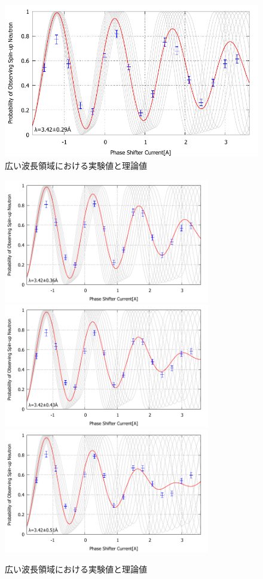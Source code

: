 \begin{figure}[H]
\includegraphics[width=9.cm]{discussion/SEA/IT_480_40.pdf}
\caption{広い波長領域における実験値と理論値}
\end{figure}
\begin{figure}[H]
\ContinuedFloat
\centering
\includegraphics[width=9cm]{discussion/SEA/IT_480_50.pdf}
\includegraphics[width=9cm]{discussion/SEA/IT_480_60.pdf}
\includegraphics[width=9cm]{discussion/SEA/IT_480_70.pdf}
\caption{広い波長領域における実験値と理論値}
\end{figure}

